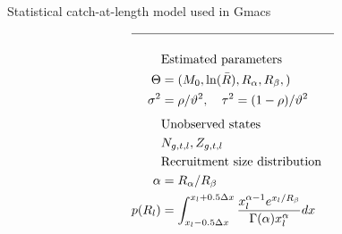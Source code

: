 \begin{table}
  \centering
\caption{Statistical catch-at-length model used in Gmacs}
\label{tab:statistical_catch_length_model}
\tableEq
    \begin{align}
        \hline \nonumber \\
        &\mbox{Estimated parameters} \nonumber\\
        \Theta&= 
                (M_0,\ln(\bar{R}),R_\alpha,R_\beta,)\label{T4.1}\\
        \sigma^2&=\rho /\vartheta^2, \quad
        \tau^2=(1-\rho)/\vartheta^2\label{T4.2}\\[1ex]
        &\mbox{Unobserved states} \nonumber\\
        &N_{g,t,l},Z_{g,t,l}    \label{T4.3}\\
    	&\mbox{Recruitment size distribution} \nonumber\\
    	\alpha &= R_\alpha /R_\beta \\
    	p(R_l) &= \int_{x_l-0.5\Delta x}^{x_l+0.5\Delta x} 
    	\frac{x_l^{\alpha-1}e^{x_l/R_\beta}}{\Gamma(\alpha)x_l^\alpha}dx\\

\end{align}
\end{table}
